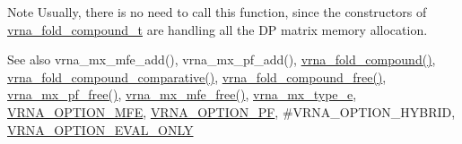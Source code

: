 \begin{DoxyNote}{Note}
Usually, there is no need to call this function, since the constructors of \hyperlink{group__fold__compound_ga1b0cef17fd40466cef5968eaeeff6166}{vrna\+\_\+fold\+\_\+compound\+\_\+t} are handling all the D\+P matrix memory allocation.
\end{DoxyNote}
\begin{DoxySeeAlso}{See also}
vrna\+\_\+mx\+\_\+mfe\+\_\+add(), vrna\+\_\+mx\+\_\+pf\+\_\+add(), \hyperlink{group__fold__compound_ga6601d994ba32b11511b36f68b08403be}{vrna\+\_\+fold\+\_\+compound()}, \hyperlink{group__fold__compound_gad6bacc816af274922b13d947f708aa0c}{vrna\+\_\+fold\+\_\+compound\+\_\+comparative()}, \hyperlink{group__fold__compound_gadded6039d63f5d6509836e20321534ad}{vrna\+\_\+fold\+\_\+compound\+\_\+free()}, \hyperlink{group__dp__matrices_ga2283e69fd139fb8e58d7ade3b5773f9c}{vrna\+\_\+mx\+\_\+pf\+\_\+free()}, \hyperlink{group__dp__matrices_ga6a9422feb5dfe5c64050cebf447672d0}{vrna\+\_\+mx\+\_\+mfe\+\_\+free()}, \hyperlink{group__dp__matrices_ga6042ea1d58d01931e959791be6d89343}{vrna\+\_\+mx\+\_\+type\+\_\+e}, \hyperlink{group__fold__compound_gae63be9127fe7dcc1f9bb14f5bb1064ee}{V\+R\+N\+A\+\_\+\+O\+P\+T\+I\+O\+N\+\_\+\+M\+F\+E}, \hyperlink{group__fold__compound_gabfbadcddda3e74ce7f49035ef8f058f7}{V\+R\+N\+A\+\_\+\+O\+P\+T\+I\+O\+N\+\_\+\+P\+F}, \#\+V\+R\+N\+A\+\_\+\+O\+P\+T\+I\+O\+N\+\_\+\+H\+Y\+B\+R\+I\+D, \hyperlink{group__fold__compound_ga61469c423131552c8483229f8b6c7e0e}{V\+R\+N\+A\+\_\+\+O\+P\+T\+I\+O\+N\+\_\+\+E\+V\+A\+L\+\_\+\+O\+N\+L\+Y}
\end{DoxySeeAlso}

